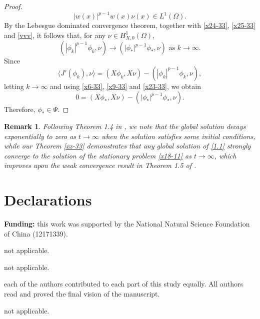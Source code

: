 \documentclass[11pt,a4paper]{article}
\numberwithin{equation}{section}
\newtheorem{remark}{Remark}[section]
\numberwithin{remark}{section}
\begin{document}
\begin{proof}
\begin{equation}
|w(x)|^{p-1}w(x)\nu(x)\in L^1(\Omega).
\end{equation}
By the Lebesgue dominated convergence theorem, together with \eqref{x24-33}, \eqref{x25-33} and \eqref{vvv}, it follows that, for any $\nu\in H_{X,0}^1(\Omega)$,
\begin{equation}\label{x23-33}
\left(|\phi_k|^{p-1}\phi_k,\nu\right)\rightarrow\left(|\phi_*|^{p-1}\phi_*,\nu\right) \mbox{  as  } k\rightarrow\infty.
\end{equation}
Since
\begin{equation*}
\langle J'(\phi_k),\nu\rangle=(X\phi_k,X\nu)-\left(|\phi_k|^{p-1}\phi_k,\nu\right),
\end{equation*}
letting $k\rightarrow \infty$ and using \eqref{x6-33}, \eqref{x9-33} and \eqref{x23-33}, we obtain
\begin{equation*}
0=(X\phi_*,X\nu)-\left(|\phi_*|^{p-1}\phi_*,\nu\right).
\end{equation*}
Therefore, $\phi_*\in \Psi$.
\end{proof}

\begin{remark}
Following Theorem 1.4 in \cite{MR3961341}, we note that the global solution decays exponentially to zero as $t\rightarrow\infty$ when the solution satisfies some initial conditions, while our Theorem \ref{xx-33} demonstrates that any global solution of \eqref{1.1} strongly converge to the solution of the stationary problem \eqref{x18-11} as $t\rightarrow \infty$, which improves upon the weak convergence result in Theorem 1.5 of \cite{MR4854159}.
\end{remark}


\section*{Declarations}
{\bf Funding:} this work was supported by the National Natural Science Foundation of China (12171339).

 not applicable.%

 not applicable.

 each of the authors contributed to each part of this study equally. All authors read and proved the final vision of the manuscript.

 not applicable. %
\end{document}
